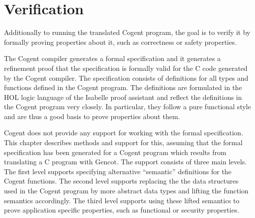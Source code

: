 \documentclass[a4paper]{report}
\begin{document}
\chapter{Verification}

Additionally to running the translated Cogent program, the goal is to verify it by formally proving properties
about it, such as correctness or safety properties.

The Cogent compiler generates a formal specification and it generates a refinement proof that the specification
is formally valid for the C code generated by the Cogent compiler. The specification consists of definitions for
all types and functions defined in the Cogent program. The definitions are formulated in the HOL logic language
of the Isabelle proof assistant and reflect the definitions in the Cogent program very closely. In particular,
they follow a pure functional style and are thus a good basis to prove properties about them.

Cogent does not provide any support for working with the formal specification. This chapter describes methods
and support for this, assuming that the formal specification has been generated for a Cogent program which results
from translating a C program with Gencot. The support consists of three main levels. The first level supports
specifying alternative ``semantic'' definitions for the Cogent functions. The second level supports replacing the 
the data structures used in the Cogent program by more abstract data types and lifting the function semantics
accordingly. The third level supports using these lifted semantics to prove application specific properties, such
as functional or security properties.



%

%

%
\end{document}
